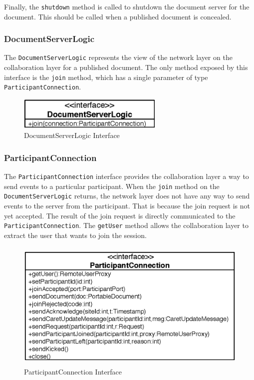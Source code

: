 Finally, the \texttt{shutdown} method is called to shutdown the document
server for the document. This should be called when a published document
is concealed.

\subsubsection{DocumentServerLogic}
\label{sect:archoverview.net.documentserverlogic}
The \texttt{Document\-Server\-Logic} represents the view of the network layer
on the collaboration layer for a published document. The only method
exposed by this interface is the \texttt{join} method, which has a single
parameter of type \texttt{Participant\-Connection}.

\begin{figure}[H]
 \centering
 \includegraphics[width=6.99cm,height=1.55cm]{../images/finalreport/architecture_documentserverlogic_uml.eps}
 \caption{DocumentServerLogic Interface}
\end{figure}

\subsubsection{ParticipantConnection}
The \texttt{Participant\-Connection} interface provides the collaboration layer
a way to send events to a particular participant. When the \texttt{join}
method on the \texttt{Document\-Server\-Logic} returns, the network layer does
not have any way to send events to the server from the participant. That
is because the join request is not yet accepted. The result of the join
request is directly communicated to the \texttt{Participant\-Connection}.
The \texttt{get\-User} method allows the collaboration layer to extract the
user that wants to join the session.

\begin{figure}[H]
 \centering
 \includegraphics[width=11.96cm,height=6.21cm]{../images/finalreport/architecture_participantconnection_uml.eps}
 \caption{ParticipantConnection Interface}
\end{figure}

